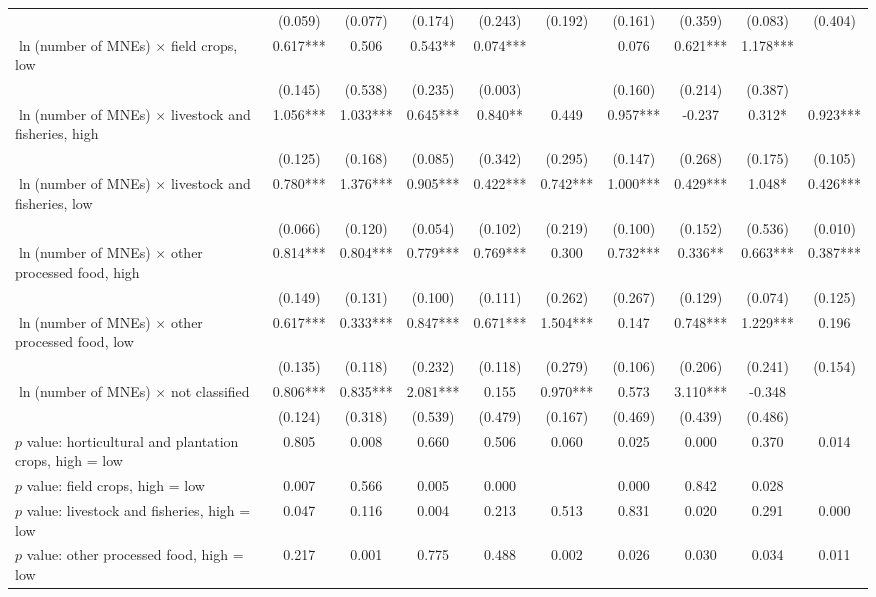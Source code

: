 \begin{tabular}{l*{9}{c}}
 & (0.059) & (0.077) & (0.174) & (0.243) & (0.192) & (0.161) & (0.359) & (0.083) & (0.404) \\
$\ln$(number of MNEs) $\times$ field crops, low & 0.617*** & 0.506 & 0.543** & 0.074*** &  & 0.076 & 0.621*** & 1.178*** &  \\
 & (0.145) & (0.538) & (0.235) & (0.003) &  & (0.160) & (0.214) & (0.387) &  \\
$\ln$(number of MNEs) $\times$ livestock and fisheries, high & 1.056*** & 1.033*** & 0.645*** & 0.840** & 0.449 & 0.957*** & -0.237 & 0.312* & 0.923*** \\
 & (0.125) & (0.168) & (0.085) & (0.342) & (0.295) & (0.147) & (0.268) & (0.175) & (0.105) \\
$\ln$(number of MNEs) $\times$ livestock and fisheries, low & 0.780*** & 1.376*** & 0.905*** & 0.422*** & 0.742*** & 1.000*** & 0.429*** & 1.048* & 0.426*** \\
 & (0.066) & (0.120) & (0.054) & (0.102) & (0.219) & (0.100) & (0.152) & (0.536) & (0.010) \\
$\ln$(number of MNEs) $\times$ other processed food, high & 0.814*** & 0.804*** & 0.779*** & 0.769*** & 0.300 & 0.732*** & 0.336** & 0.663*** & 0.387*** \\
 & (0.149) & (0.131) & (0.100) & (0.111) & (0.262) & (0.267) & (0.129) & (0.074) & (0.125) \\
$\ln$(number of MNEs) $\times$ other processed food, low & 0.617*** & 0.333*** & 0.847*** & 0.671*** & 1.504*** & 0.147 & 0.748*** & 1.229*** & 0.196 \\
 & (0.135) & (0.118) & (0.232) & (0.118) & (0.279) & (0.106) & (0.206) & (0.241) & (0.154) \\
$\ln$(number of MNEs) $\times$ not classified & 0.806*** & 0.835*** & 2.081*** & 0.155 & 0.970*** & 0.573 & 3.110*** & -0.348 &  \\
 & (0.124) & (0.318) & (0.539) & (0.479) & (0.167) & (0.469) & (0.439) & (0.486) &  \\
$p$ value: horticultural and plantation crops, high = low & 0.805 & 0.008 & 0.660 & 0.506 & 0.060 & 0.025 & 0.000 & 0.370 & 0.014 \\
$p$ value: field crops, high = low & 0.007 & 0.566 & 0.005 & 0.000 &  & 0.000 & 0.842 & 0.028 &  \\
$p$ value: livestock and fisheries, high = low & 0.047 & 0.116 & 0.004 & 0.213 & 0.513 & 0.831 & 0.020 & 0.291 & 0.000 \\
$p$ value: other processed food, high = low & 0.217 & 0.001 & 0.775 & 0.488 & 0.002 & 0.026 & 0.030 & 0.034 & 0.011 \\

\end{tabular}
